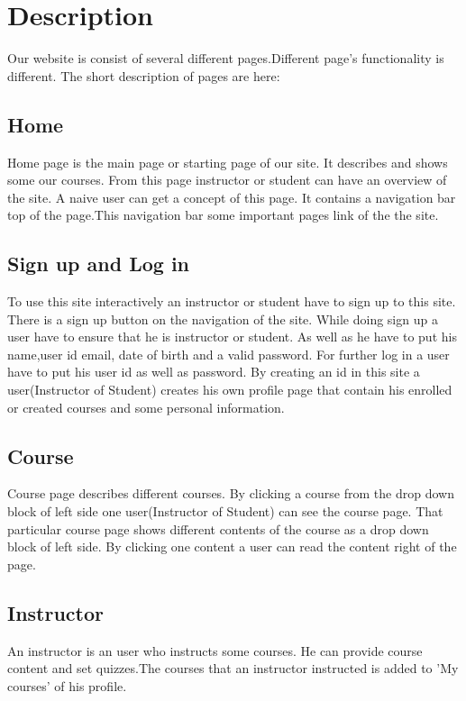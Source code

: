 \documentclass[12pt]{article}
\begin{document}
\section{Description}
\par Our website is consist of several different pages.Different page's functionality is different. The short description of pages are here: 
%
%
\subsection{Home}
\par Home page is the main page or starting page of our site. It describes and shows some our courses. From this page instructor or student can have an overview of the site. A naive user can get a concept of this page. It contains a navigation bar top of the page.This navigation bar some important pages link of the the site.
%
\subsection{Sign up and Log in}
To use this site interactively an instructor or student have to sign up to this site. There is a sign up button on the navigation of the site. While doing sign up a user have to ensure that he is instructor or student. As well as he have to put his name,user id email, date of birth and a valid password. For further log in a user have to put his user id as well as password. By creating an id in this site a user(Instructor of Student) creates his own profile page that contain his enrolled or created courses and some personal information.
% 
\subsection{Course}
\par Course page describes different courses. By clicking a course from the drop down block of left side one user(Instructor of Student) can see the course page. That particular course page shows different contents of the course as a drop down block of left side. By clicking one content a user can read the content right of the page. 

\subsection{Instructor}
\par An instructor is an user who instructs some courses. He can provide course content and set quizzes.The courses that an instructor instructed is added to 'My courses' of his profile.
%   
\end{document}
